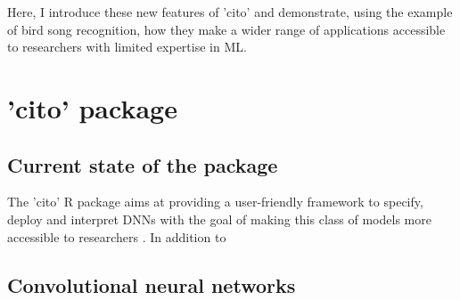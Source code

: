 \documentclass{article}
\begin{document}
Here, I introduce these new features of 'cito' and demonstrate, using the example of bird song recognition, how they make a wider range of applications accessible to researchers with limited expertise in \ac{ML}.


\section{'cito' package}
\subsection{Current state of the package}
The 'cito' R package aims at providing a user-friendly framework to specify, deploy and interpret \acp{DNN} with the goal of making this class of models more accessible to researchers \citep{amesoderCitoPackageTraining2024}. In addition to
\subsection{Convolutional neural networks}
\end{document}
